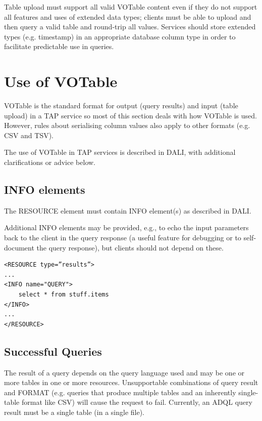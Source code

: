 \documentclass[11pt,letter]{ivoa}
\begin{document}
Table upload must support all valid VOTable content even if they do not support 
all features and uses of extended data types; clients must be able to upload and then
query a valid table and round-trip all values. Services should store extended types (e.g. 
timestamp) in an appropriate database column type in order to facilitate predictable use 
in queries.

\section{Use of VOTable}
\label{sec:votable}

VOTable \citep{std:VOTable} is the standard format for output (query 
results) and input (table upload) in a TAP service so most of this section 
deals with how VOTable is used. However, rules about serialising column values 
also apply to other formats (e.g. CSV and TSV).

The use of VOTable in TAP services is described in DALI, with additional clarifications
or advice below.

\subsection{INFO elements}
\label{sec:vot-info}

The RESOURCE element must contain INFO element(s) as described in DALI.

Additional INFO elements may be provided, e.g., to echo the input parameters 
back to the client in the query response (a useful feature for debugging or to 
self-document the query response), but clients should not depend on these. 

\begin{verbatim}
<RESOURCE type=”results”>
...
<INFO name="QUERY">
    select * from stuff.items
</INFO>
...
</RESOURCE>
\end{verbatim}

\subsection{Successful Queries}
\label{sec:query-ok}

The result of a query depends on the query language used and may be one or more 
tables in one or more resources. Unsupportable combinations of query result and 
FORMAT (e.g. queries that produce multiple tables and an inherently 
single-table format like CSV) will cause the request to fail. Currently, an ADQL 
query result must be a single table (in a single file).
\end{document}
